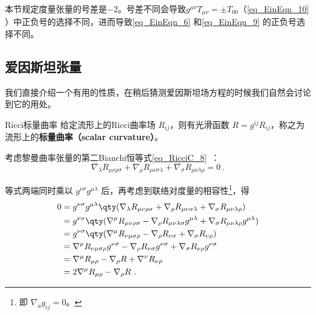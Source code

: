 

本节规定度量张量的号差是$-2$。号差不同会导致$g^{\mu\nu}T_{\mu\nu}=\pm T_{00}$（\autoref{eq_EinEqn_10} ）中正负号的选择不同，进而导致\autoref{eq_EinEqn_6} 和\autoref{eq_EinEqn_9} 的正负号选择不同。

\subsection{爱因斯坦张量}

我们直接介绍一个有用的性质，在稍后猜测爱因斯坦场方程的时候我们自然会讨论到它的用处。

\begin{definition}{Ricci标量曲率}
给定流形上的Ricci曲率场 $R_{ij}$，则有光滑函数 $R=g^{ij}R_{ij}$，称之为流形上的\textbf{标量曲率（scalar curvature）}。
\end{definition}

考虑黎曼曲率张量的第二Bianchi恒等式\autoref{eq_RicciC_8}~：
\begin{equation}
\nabla_\lambda R_{\mu\nu\rho\sigma}+\nabla_\rho R_{\mu\nu\sigma\lambda}+\nabla_\sigma R_{\mu\nu\lambda\rho}=0~.
\end{equation}

等式两端同时乘以 $g^{\nu\sigma}g^{\mu\lambda}$ 后，再考虑到联络对度量的相容性\footnote{即 $\nabla_ag_{ij}=0$。}，得
\begin{equation}
\begin{aligned}
0&=g^{\nu\sigma}g^{\mu\lambda}\qty(\nabla_\lambda R_{\mu\nu\rho\sigma}+\nabla_\rho R_{\mu\nu\sigma\lambda}+\nabla_\sigma R_{\mu\nu\lambda\rho})\\
&=g^{\nu\sigma}\qty(\nabla^\mu R_{\mu\nu\rho\sigma} - \nabla_\rho R_{\mu\nu\lambda\sigma}g^{\mu\lambda} + \nabla_\sigma R_{\mu\nu\lambda\rho}g^{\mu\lambda})\\
&=g^{\nu\sigma}\qty(\nabla^\mu R_{\nu\mu\sigma\rho} - \nabla_\rho R_{\nu\sigma} + \nabla_\sigma R_{\nu\rho})\\
&=\nabla^\mu R_{\nu\mu\sigma\rho}g^{\nu\sigma} - \nabla_\rho R_{\nu\sigma}g^{\nu\sigma} + \nabla_\sigma R_{\nu\rho}g^{\nu\sigma}\\
&=\nabla^\mu R_{\mu\rho} - \nabla_\rho R + \nabla^\nu R_{\nu\rho}\\
&=2\nabla^\mu R_{\mu\rho} - \nabla_\rho R~.
\end{aligned}
\end{equation}

